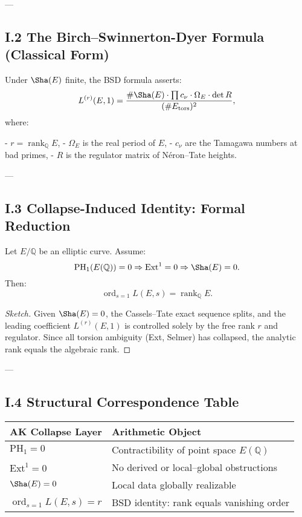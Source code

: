 ---

\subsection*{I.2 The Birch–Swinnerton-Dyer Formula (Classical Form)}

Under \( \Sha(E) \) finite, the BSD formula asserts:
\[
L^{(r)}(E, 1) = \frac{\#\Sha(E) \cdot \prod c_\nu \cdot \Omega_E \cdot \det R}{(\# E_{\text{tors}})^2},
\]
where:

- \( r = \operatorname{rank}_{\mathbb{Q}} E \),
- \( \Omega_E \) is the real period of \( E \),
- \( c_\nu \) are the Tamagawa numbers at bad primes,
- \( R \) is the regulator matrix of Néron–Tate heights.

---

\subsection*{I.3 Collapse-Induced Identity: Formal Reduction}

\begin{theorem}
Let \( E/\mathbb{Q} \) be an elliptic curve.  
Assume:
\[
\mathrm{PH}_1(E(\mathbb{Q})) = 0 \Rightarrow \mathrm{Ext}^1 = 0 \Rightarrow \Sha(E) = 0.
\]
Then:
\[
\operatorname{ord}_{s=1} L(E,s) = \operatorname{rank}_{\mathbb{Q}} E.
\]
\end{theorem}

\begin{proof}[Sketch]
Given \( \Sha(E) = 0 \), the Cassels–Tate exact sequence splits, and the leading coefficient \( L^{(r)}(E,1) \) is controlled solely by the free rank \( r \) and regulator.  
Since all torsion ambiguity (Ext, Selmer) has collapsed, the analytic rank equals the algebraic rank.
\end{proof}

---

\subsection*{I.4 Structural Correspondence Table}

\begin{center}
\begin{tabular}{ll}
\toprule
\textbf{AK Collapse Layer} & \textbf{Arithmetic Object} \\
\midrule
\( \mathrm{PH}_1 = 0 \)         & Contractibility of point space \( E(\mathbb{Q}) \) \\
\( \mathrm{Ext}^1 = 0 \)        & No derived or local–global obstructions \\
\( \Sha(E) = 0 \)              & Local data globally realizable \\
\( \operatorname{ord}_{s=1} L(E,s) = r \) & BSD identity: rank equals vanishing order \\
\bottomrule
\end{tabular}
\end{center}

